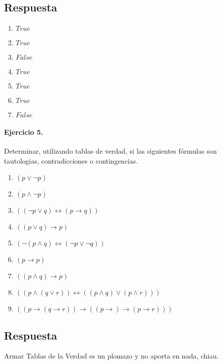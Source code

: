 \documentclass[a4paper]{article}
\begin{document}
\subsection*{Respuesta}

\begin{multicols}{2}
\begin{enumerate}[label=\alph*)]
	\item $ True$
	\item $ True$
	\item $ False$
	\item $ True$
	\item $ True$
	\item $ True$
	\item $ False$
\end{enumerate}
\end{multicols}


\paragraph{\textbf{Ejercicio 5.}} Determinar, utilizando tablas de verdad, si las siguientes fórmulas son tautologias, contradicciones o contingencias.

\begin{multicols}{2}
\begin{enumerate}[label=\alph*)]
\item $ (p \vee \neg p)$
\item $ (p \wedge \neg p) $
\item $ ((\neg p \vee q) \leftrightarrow(p \rightarrow q))$
\item $ ((p \vee q) \rightarrow p)$
\item $ (\neg (p \wedge q) \leftrightarrow(\neg p \vee \neg q)) $ 
\item $ (p \rightarrow p) $
\item $ ((p \wedge q) \rightarrow p)$
\item $ ((p \wedge (q \vee r)) \leftrightarrow ((p \wedge q)\vee (p \wedge r)))$  
\item $ ((p \rightarrow (q \rightarrow r))\rightarrow ((p \rightarrow ) \rightarrow (p \rightarrow r))) $
              
\end{enumerate}
\end{multicols}

\subsection*{Respuesta}
Armar Tablas de la Verdad es un plomazo y no aporta en nada, chiau.
\end{document}

